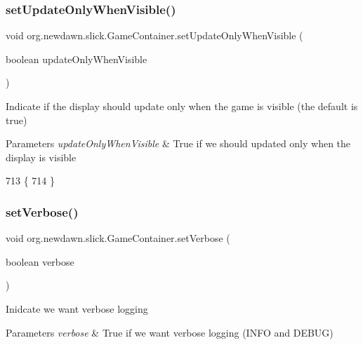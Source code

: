 \subsubsection{\texorpdfstring{set\+Update\+Only\+When\+Visible()}{setUpdateOnlyWhenVisible()}}
{\footnotesize\ttfamily void org.\+newdawn.\+slick.\+Game\+Container.\+set\+Update\+Only\+When\+Visible (\begin{DoxyParamCaption}\item[{boolean}]{update\+Only\+When\+Visible }\end{DoxyParamCaption})\hspace{0.3cm}{\ttfamily [inline]}}

Indicate if the display should update only when the game is visible (the default is true)


\begin{DoxyParams}{Parameters}
{\em update\+Only\+When\+Visible} & True if we should updated only when the display is visible \\
\hline
\end{DoxyParams}

\begin{DoxyCode}
713                                                                         \{
714     \}
\end{DoxyCode}
\mbox{\label{classorg_1_1newdawn_1_1slick_1_1_game_container_a9b177f8e7cc67befdd15c2f235dd11fe}} 
\subsubsection{\texorpdfstring{set\+Verbose()}{setVerbose()}}
{\footnotesize\ttfamily void org.\+newdawn.\+slick.\+Game\+Container.\+set\+Verbose (\begin{DoxyParamCaption}\item[{boolean}]{verbose }\end{DoxyParamCaption})\hspace{0.3cm}{\ttfamily [inline]}}

Inidcate we want verbose logging


\begin{DoxyParams}{Parameters}
{\em verbose} & True if we want verbose logging (I\+N\+FO and D\+E\+B\+UG) \\
\hline
\end{DoxyParams}

